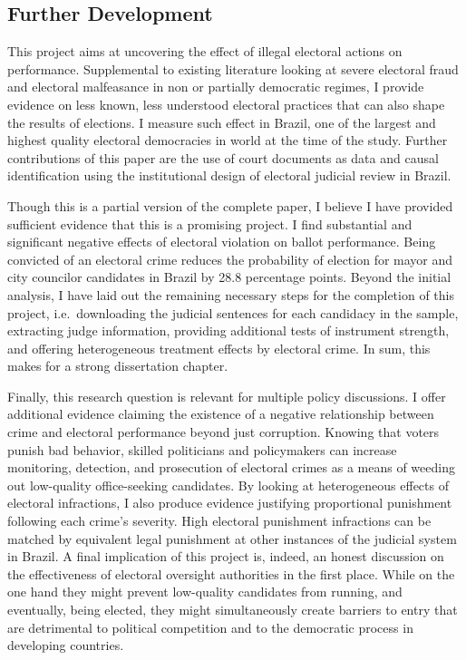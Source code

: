\documentclass[11pt]{article}
\begin{document}
\subsection{Further Development} \label{subsec:conclusion_paper1}

This project aims at uncovering the effect of illegal electoral actions on performance. Supplemental to existing literature looking at severe electoral fraud and electoral malfeasance in non or partially democratic regimes, I provide evidence on less known, less understood electoral practices that can also shape the results of elections. I measure such effect in Brazil, one of the largest and highest quality electoral democracies in world at the time of the study. Further contributions of this paper are the use of court documents as data and causal identification using the institutional design of electoral judicial review in Brazil.

Though this is a partial version of the complete paper, I believe I have provided sufficient evidence that this is a promising project. I find substantial and significant negative effects of electoral violation on ballot performance. Being convicted of an electoral crime reduces the probability of election for mayor and city councilor candidates in Brazil by 28.8 percentage points. Beyond the initial analysis, I have laid out the remaining necessary steps for the completion of this project, i.e.~downloading the judicial sentences for each candidacy in the sample, extracting judge information, providing additional tests of instrument strength, and offering heterogeneous treatment effects by electoral crime. In sum, this makes for a strong dissertation chapter.

Finally, this research question is relevant for multiple policy discussions. I offer additional evidence claiming the existence of a negative relationship between crime and electoral performance beyond just corruption. Knowing that voters punish bad behavior, skilled politicians and policymakers can increase monitoring, detection, and prosecution of electoral crimes as a means of weeding out low-quality office-seeking candidates. By looking at heterogeneous effects of electoral infractions, I also produce evidence justifying proportional punishment following each crime's severity. High electoral punishment infractions can be matched by equivalent legal punishment at other instances of the judicial system in Brazil. A final implication of this project is, indeed, an honest discussion on the effectiveness of electoral oversight authorities in the first place. While on the one hand they might prevent low-quality candidates from running, and eventually, being elected, they might simultaneously create barriers to entry that are detrimental to political competition and to the democratic process in developing countries.
\end{document}

